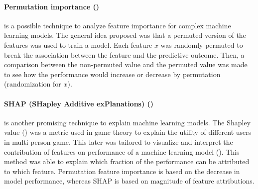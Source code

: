 \paragraph{Permutation importance (\cite{Altmann2010-lq})} is a possible technique to analyze feature importance for complex machine learning models. The general idea proposed was that a permuted version of the features was used to train a model. Each feature $x$ was randomly permuted to break the association between the feature and the predictive outcome. Then, a comparison between the non-permuted value and the permuted value was made to see how the performance would increase or decrease by permutation (randomization for $x$). 

\paragraph{SHAP (SHapley Additive exPlanations) (\cite{Lundberg2017-wo})} is another promising technique to explain machine learning models. The Shapley value (\cite{Shapley1953-cc}) was a metric used in game theory to explain the utility of different users in multi-person game. This later was tailored to visualize and interpret the contribution of features on performance of a machine learning model (\cite{Lundberg2017-wo}). This method was able to explain which fraction of the performance can be attributed to which feature. 
Permutation feature importance is based on the decrease in model performance, whereas SHAP is based on magnitude of feature attributions.